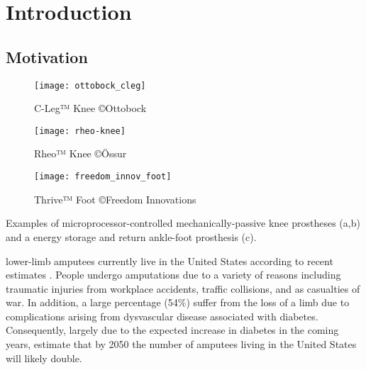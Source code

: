 \chapter{Introduction}\label{sec:intro}

\section{Motivation}\label{sec:intro_motivation}
\begin{marginfigure}[0.8in]
    \centering
	\begin{subfigure}[b]{\textwidth}
    	\centering
        \texttt{[image: ottobock\_cleg]}
        \caption{C-Leg™ Knee ©Ottobock}
        \label{fig:ottobock_cleg}
        \vspace{0.25in}
	\end{subfigure}
	\begin{subfigure}[b]{\textwidth}
    	\centering
        \texttt{[image: rheo-knee]}
        \caption{Rheo™  Knee ©Össur}
        \label{fig:ossur_rheo}
        \vspace{0.25in}
	\end{subfigure}
	\begin{subfigure}[b]{\textwidth}
    	\centering
        \texttt{[image: freedom\_innov\_foot]}
        \caption{Thrive™ Foot ©Freedom Innovations}
        \label{fig:freedom_innovations_foot}
	\end{subfigure}
    \caption{Examples of microprocessor-controlled mechanically-passive knee
    prostheses (a,b) and a energy storage and return ankle-foot prosthesis (c).}
\end{marginfigure}
 lower-limb amputees currently live in the
United States according to recent estimates \citep{ziegler2008estimating}.
People undergo amputations due to a variety of reasons including traumatic
injuries from workplace accidents, traffic collisions, and as casualties of war.
In addition, a large percentage (54\%) suffer from the loss of a limb due to
complications arising from dysvascular disease associated with diabetes.
Consequently, largely due to the expected increase in diabetes in the coming
years, \citet{ziegler2008estimating} estimate that by 2050 the number of
amputees living in the United States will likely double.

